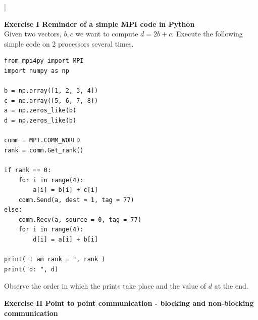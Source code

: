 \documentclass[11pt]{article}
\begin{document}
\lstset{frameround=fttt,language=Matlab}

\lstMakeShortInline[columns=fixed]|


{\bf{Exercise I Reminder of a simple MPI code in Python}}\\

Given two vectors, $b, c$ we want to compute $d = 2b + c$. Execute the following simple code on 2 processors several times. 

\begin{verbatim}
from mpi4py import MPI 
import numpy as np  

b = np.array([1, 2, 3, 4])
c = np.array([5, 6, 7, 8])
a = np.zeros_like(b)
d = np.zeros_like(b)

comm = MPI.COMM_WORLD
rank = comm.Get_rank()

if rank == 0:
    for i in range(4):
        a[i] = b[i] + c[i]
    comm.Send(a, dest = 1, tag = 77)
else:
    comm.Recv(a, source = 0, tag = 77)
    for i in range(4):
        d[i] = a[i] + b[i]

print("I am rank = ", rank )
print("d: ", d)
\end{verbatim}

Observe the order in which the prints take place and the value of $d$ at the end. \\

\bigskip

{\bf{Exercise II Point to point communication - blocking and non-blocking communication}}\\
\end{document}
